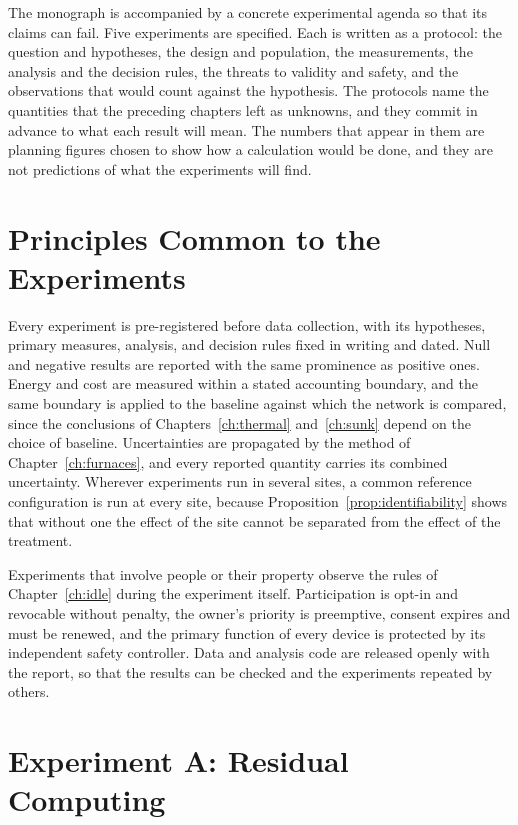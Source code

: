 The monograph is accompanied by a concrete experimental agenda so that its claims can fail. Five experiments are specified. Each is written as a protocol: the question and hypotheses, the design and population, the measurements, the analysis and the decision rules, the threats to validity and safety, and the observations that would count against the hypothesis. The protocols name the quantities that the preceding chapters left as unknowns, and they commit in advance to what each result will mean. The numbers that appear in them are planning figures chosen to show how a calculation would be done, and they are not predictions of what the experiments will find.

\section{Principles Common to the Experiments}

Every experiment is pre-registered before data collection, with its hypotheses, primary measures, analysis, and decision rules fixed in writing and dated. Null and negative results are reported with the same prominence as positive ones. Energy and cost are measured within a stated accounting boundary, and the same boundary is applied to the baseline against which the network is compared, since the conclusions of Chapters~\ref{ch:thermal} and~\ref{ch:sunk} depend on the choice of baseline. Uncertainties are propagated by the method of Chapter~\ref{ch:furnaces}, and every reported quantity carries its combined uncertainty. Wherever experiments run in several sites, a common reference configuration is run at every site, because Proposition~\ref{prop:identifiability} shows that without one the effect of the site cannot be separated from the effect of the treatment.

Experiments that involve people or their property observe the rules of Chapter~\ref{ch:idle} during the experiment itself. Participation is opt-in and revocable without penalty, the owner's priority is preemptive, consent expires and must be renewed, and the primary function of every device is protected by its independent safety controller. Data and analysis code are released openly with the report, so that the results can be checked and the experiments repeated by others.

\section{Experiment A: Residual Computing}


